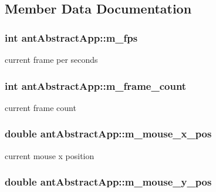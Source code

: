 \subsection{Member Data Documentation}
\hypertarget{classant_abstract_app_a9d6e7846652cca2333831a19b1a4dad8}{
\subsubsection[{m\+\_\+fps}]{\setlength{\rightskip}{0pt plus 5cm}int ant\+Abstract\+App\+::m\+\_\+fps\hspace{0.3cm}{\ttfamily [protected]}}}\label{classant_abstract_app_a9d6e7846652cca2333831a19b1a4dad8}
current frame per seconds \hypertarget{classant_abstract_app_a3346b67b4fe4b9627d9dbb064a08669b}{
\subsubsection[{m\+\_\+frame\+\_\+count}]{\setlength{\rightskip}{0pt plus 5cm}int ant\+Abstract\+App\+::m\+\_\+frame\+\_\+count\hspace{0.3cm}{\ttfamily [protected]}}}\label{classant_abstract_app_a3346b67b4fe4b9627d9dbb064a08669b}
current frame count \hypertarget{classant_abstract_app_a3dd118d6793e653f1207abc4b498608d}{
\subsubsection[{m\+\_\+mouse\+\_\+x\+\_\+pos}]{\setlength{\rightskip}{0pt plus 5cm}double ant\+Abstract\+App\+::m\+\_\+mouse\+\_\+x\+\_\+pos\hspace{0.3cm}{\ttfamily [protected]}}}\label{classant_abstract_app_a3dd118d6793e653f1207abc4b498608d}
current mouse x position \hypertarget{classant_abstract_app_a44c5d57e580b3e68d076f638aa866bef}{
\subsubsection[{m\+\_\+mouse\+\_\+y\+\_\+pos}]{\setlength{\rightskip}{0pt plus 5cm}double ant\+Abstract\+App\+::m\+\_\+mouse\+\_\+y\+\_\+pos\hspace{0.3cm}{\ttfamily [protected]}}}\label{classant_abstract_app_a44c5d57e580b3e68d076f638aa866bef}
